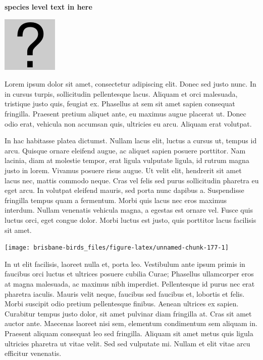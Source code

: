 \documentclass[]{book}
\let\origfigure\figure
\let\endorigfigure\endfigure
\renewenvironment{figure}[1][2] {
  \expandafter\origfigure\expandafter[H]
} {
  \endorigfigure
}
\begin{document}
\textbf{species level text in here}

\begin{figure}
\centering
\includegraphics{assets/missing.png}
\caption{No image for species}
\end{figure}

Lorem ipsum dolor sit amet, consectetur adipiscing elit. Donec sed justo
nunc. In in cursus turpis, sollicitudin pellentesque lacus. Aliquam et
orci malesuada, tristique justo quis, feugiat ex. Phasellus at sem sit
amet sapien consequat fringilla. Praesent pretium aliquet ante, eu
maximus augue placerat ut. Donec odio erat, vehicula non accumsan quis,
ultricies eu arcu. Aliquam erat volutpat.

In hac habitasse platea dictumst. Nullam lacus elit, luctus a cursus ut,
tempus id arcu. Quisque ornare eleifend augue, ac aliquet sapien posuere
porttitor. Nam lacinia, diam at molestie tempor, erat ligula vulputate
ligula, id rutrum magna justo in lorem. Vivamus posuere risus augue. Ut
velit elit, hendrerit sit amet lacus nec, mattis commodo neque. Cras vel
felis sed purus sollicitudin pharetra eu eget arcu. In volutpat eleifend
mauris, sed porta nunc dapibus a. Suspendisse fringilla tempus quam a
fermentum. Morbi quis lacus nec eros maximus interdum. Nullam venenatis
vehicula magna, a egestas est ornare vel. Fusce quis luctus orci, eget
congue dolor. Morbi luctus est justo, quis porttitor lacus facilisis sit
amet.

\begin{figure}
\texttt{[image: brisbane-birds\_files/figure-latex/unnamed-chunk-177-1]} \caption{insert figure caption}\label{fig:unnamed-chunk-177}
\end{figure}

In ut elit facilisis, laoreet nulla et, porta leo. Vestibulum ante ipsum
primis in faucibus orci luctus et ultrices posuere cubilia Curae;
Phasellus ullamcorper eros at magna malesuada, ac maximus nibh
imperdiet. Pellentesque id purus nec erat pharetra iaculis. Mauris velit
neque, faucibus sed faucibus et, lobortis et felis. Morbi suscipit odio
pretium pellentesque finibus. Aenean ultrices ex sapien. Curabitur
tempus justo dolor, sit amet pulvinar diam fringilla at. Cras sit amet
auctor ante. Maecenas laoreet nisi sem, elementum condimentum sem
aliquam in. Praesent aliquam consequat leo sed fringilla. Aliquam sit
amet metus quis ligula ultricies pharetra ut vitae velit. Sed sed
vulputate mi. Nullam et elit vitae arcu efficitur venenatis.
\end{document}

